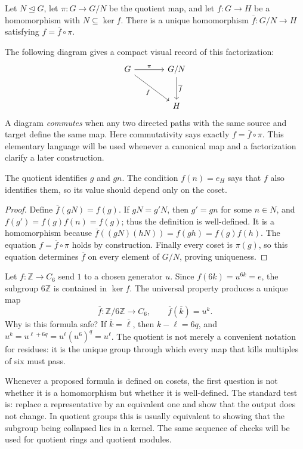 \begin{theorem}
Let \(N\trianglelefteq G\), let \(\pi:G\to G/N\) be the quotient map, and
let \(f:G\to H\) be a homomorphism with \(N\subseteq\ker f\).  There is a
unique homomorphism \(\overline f:G/N\to H\) satisfying
\(f=\overline f\circ\pi\).
\end{theorem}
The following diagram gives a compact visual record of this factorization:
\[
\begin{tikzcd}[column sep=large, row sep=large]
G \arrow[r, "\pi"] \arrow[dr, "f"'] & G/N \arrow[d, "\overline f"] \\
& H
\end{tikzcd}
\]
A diagram \emph{commutes} when any two directed paths with the same source and
target define the same map.  Here commutativity says exactly
\(f=\overline f\circ\pi\).  This elementary language will be used whenever a
canonical map and a factorization clarify a later construction.
\begin{proofidea}
The quotient identifies \(g\) and \(gn\). The condition \(f(n)=e_H\) says
that \(f\) also identifies them, so its value should depend only on the coset.
\end{proofidea}
\begin{proof}
Define \(\overline f(gN)=f(g)\).  If \(gN=g'N\), then \(g'=gn\) for some
\(n\in N\), and \(f(g')=f(g)f(n)=f(g)\); thus the definition is
well-defined.  It is a homomorphism because
\(\overline f((gN)(hN))=f(gh)=f(g)f(h)\).  The equation
\(f=\overline f\circ\pi\) holds by construction.  Finally every coset is
\(\pi(g)\), so this equation determines \(\overline f\) on every element of
\(G/N\), proving uniqueness.
\end{proof}

\begin{example}
Let \(f:\mathbb Z\to C_6\) send \(1\) to a chosen generator \(u\).  Since
\(f(6k)=u^{6k}=e\), the subgroup \(6\mathbb Z\) is contained in \(\ker f\).
The universal property produces a unique map
\[\overline f:\mathbb Z/6\mathbb Z\longrightarrow C_6,
\qquad \overline f(\overline k)=u^k.\]
Why is this formula safe?  If \(\overline k=\overline\ell\), then
\(k-\ell=6q\), and \(u^k=u^{\ell+6q}=u^\ell(u^6)^q=u^\ell\).  The quotient
is not merely a convenient notation for residues: it is the unique group
through which every map that kills multiples of six must pass.
\end{example}

\begin{remark}
Whenever a proposed formula is defined on cosets, the first question is not
whether it is a homomorphism but whether it is well-defined.  The standard
test is: replace a representative by an equivalent one and show that the
output does not change.  In quotient groups this is usually equivalent to
showing that the subgroup being collapsed lies in a kernel.  The same sequence
of checks will be used for quotient rings and quotient modules.
\end{remark}

